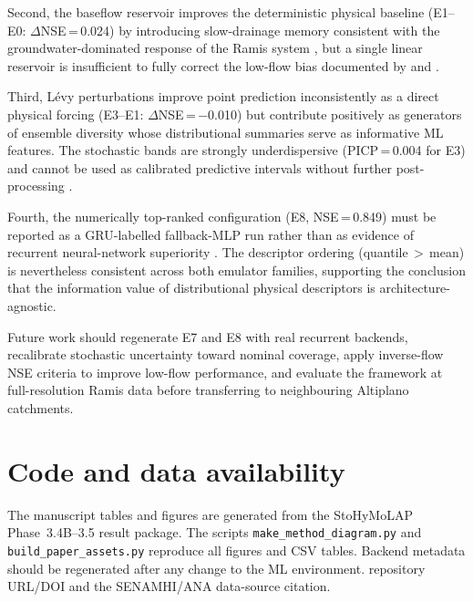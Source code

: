 \documentclass[a4paper,fleqn]{cas-sc}
\begin{document}
Second, the baseflow reservoir improves the deterministic physical
baseline (E1--E0: $\Delta$NSE\,=\,0.024) by introducing slow-drainage
memory consistent with the groundwater-dominated response of the Ramis
system \citep{nauditt2017conceptual}, but a single linear reservoir is
insufficient to fully correct the low-flow bias documented by
\citet{pushpalatha2012review} and \citet{van2013influence}.

Third, L\'{e}vy perturbations improve point prediction inconsistently
as a direct physical forcing (E3--E1: $\Delta$NSE\,=\,$-$0.010) but
contribute positively as generators of ensemble diversity whose
distributional summaries serve as informative ML features. The
stochastic bands are strongly underdispersive (PICP\,=\,0.004 for E3)
and cannot be used as calibrated predictive intervals without further
post-processing \citep{thiboult2016accounting,crochemore2016bias}.

Fourth, the numerically top-ranked configuration (E8, NSE\,=\,0.849)
must be reported as a GRU-labelled fallback-MLP run rather than as
evidence of recurrent neural-network superiority \citep{hall2021hydrologist}.
The descriptor ordering (quantile\,$>$\,mean) is nevertheless
consistent across both emulator families, supporting the conclusion
that the information value of distributional physical descriptors is
architecture-agnostic.

Future work should regenerate E7 and E8 with real recurrent backends,
recalibrate stochastic uncertainty toward nominal coverage, apply
inverse-flow NSE criteria to improve low-flow performance, and
evaluate the framework at full-resolution Ramis data before
transferring to neighbouring Altiplano catchments.

\section*{Code and data availability}

The manuscript tables and figures are generated from the StoHyMoLAP
Phase~3.4B--3.5 result package. The scripts
\texttt{make\_method\_diagram.py} and \texttt{build\_paper\_assets.py}
reproduce all figures and CSV tables. Backend metadata should be
regenerated after any change to the ML environment. %
repository URL/DOI and the SENAMHI/ANA data-source citation.
\end{document}
